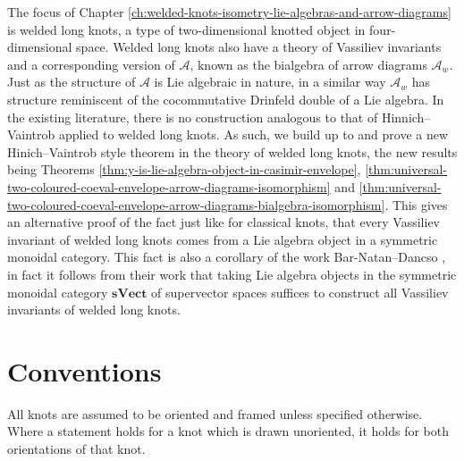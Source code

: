 The focus of Chapter \ref{ch:welded-knots-isometry-lie-algebras-and-arrow-diagrams} is welded long knots, a type of two-dimensional knotted object in four-dimensional space. Welded long knots also have a theory of Vassiliev invariants and a corresponding version of \(\mathcal{A}\), known as the bialgebra of arrow diagrams \(\mathcal{A}_{w}\). Just as the structure of \(\mathcal{A}\) is Lie algebraic in nature, in a similar way \(\mathcal{A}_{w}\) has structure reminiscent of the cocommutative Drinfeld double of a Lie algebra. In the existing literature, there is no construction analogous to that of Hinnich--Vaintrob applied to welded long knots. As such, we build up to and prove a new Hinich--Vaintrob style theorem in the theory of welded long knots, the new results being Theorems \ref{thm:y-is-lie-algebra-object-in-casimir-envelope}, \ref{thm:universal-two-coloured-coeval-envelope-arrow-diagrams-isomorphism} and \ref{thm:universal-two-coloured-coeval-envelope-arrow-diagrams-bialgebra-isomorphism}. This gives an alternative proof of the fact just like for classical knots, that every Vassiliev invariant of welded long knots comes from a Lie algebra object in a symmetric monoidal category. This fact is also a corollary of the work Bar-Natan--Dancso \cite{finite-type-invariants-of-w-knotted-objects-I-w-knots-and-the-alexander-polynomial}, in fact it follows from their work that taking Lie algebra objects in the symmetric monoidal category \(\mathbf{sVect}\) of supervector spaces suffices to construct all Vassiliev invariants of welded long knots.

\section*{Conventions}

All knots are assumed to be oriented and framed unless specified otherwise. Where a statement holds for a knot which is drawn unoriented, it holds for both orientations of that knot.
